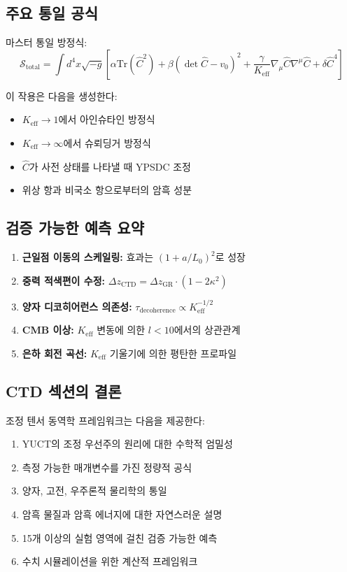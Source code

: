 \documentclass[11pt,a4paper]{article}
\begin{document}
	\subsection{주요 통일 공식}
	
	마스터 통일 방정식:
	\[
	\boxed{\mathcal{S}_{\mathrm{total}} = \int d^{4}x \sqrt{-g} \left[ \alpha \mathrm{Tr}(\hat{C}^2) + \beta (\det\hat{C} - v_0)^2 + \frac{\gamma}{K_{\mathrm{eff}}} \nabla_\mu\hat{C}\nabla^\mu\hat{C} + \delta \hat{C}^4 \right]}
	\]
	
	이 작용은 다음을 생성한다:
	\begin{itemize}
		\item $K_{\mathrm{eff}} \to 1$에서 아인슈타인 방정식
		\item $K_{\mathrm{eff}} \to \infty$에서 슈뢰딩거 방정식
		\item $\hat{C}$가 사전 상태를 나타낼 때 YPSDC 조정
		\item 위상 항과 비국소 항으로부터의 암흑 성분
	\end{itemize}
	
	\subsection{검증 가능한 예측 요약}
	
	\begin{enumerate}
		\item \textbf{근일점 이동의 스케일링:} 효과는 $(1 + a/L_0)^2$로 성장
		\item \textbf{중력 적색편이 수정:} $\Delta z_{\mathrm{CTD}} = \Delta z_{\mathrm{GR}} \cdot (1 - 2\kappa^2)$
		\item \textbf{양자 디코히어런스 의존성:} $\tau_{\mathrm{decoherence}} \propto K_{\mathrm{eff}}^{-1/2}$
		\item \textbf{CMB 이상:} $K_{\mathrm{eff}}$ 변동에 의한 $l < 10$에서의 상관관계
		\item \textbf{은하 회전 곡선:} $K_{\mathrm{eff}}$ 기울기에 의한 평탄한 프로파일
	\end{enumerate}
	
	\subsection{CTD 섹션의 결론}
	
	조정 텐서 동역학 프레임워크는 다음을 제공한다:
	\begin{enumerate}
		\item YUCT의 조정 우선주의 원리에 대한 수학적 엄밀성
		\item 측정 가능한 매개변수를 가진 정량적 공식
		\item 양자, 고전, 우주론적 물리학의 통일
		\item 암흑 물질과 암흑 에너지에 대한 자연스러운 설명
		\item 15개 이상의 실험 영역에 걸친 검증 가능한 예측
		\item 수치 시뮬레이션을 위한 계산적 프레임워크
	\end{enumerate}
	
\end{document}
